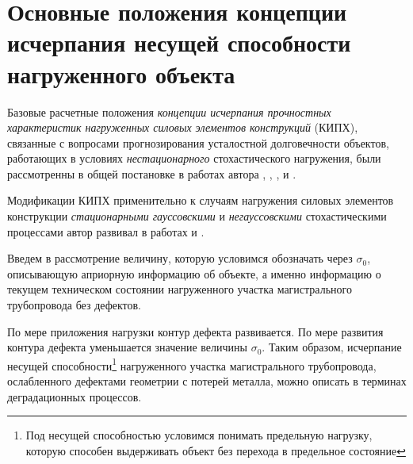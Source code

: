 \chapter{Основные положения концепции исчерпания несущей способности нагруженного объекта}\label{ch:ch1}

Базовые расчетные положения \emph{концепции исчерпания прочностных характеристик нагруженных силовых элементов конструкций} (КИПХ), связанные с вопросами прогнозирования усталостной долговечности объектов, работающих в условиях \emph{нестационарного} стохастического нагружения, были рассмотренны в общей постановке в работах автора \cite{podvoyskiy-ipmash:2009}, \cite{podvoyskiy-fund-prob:2010}, \cite{podvoyskiy-mami:2010}, \cite{podvoyskiy-sstu:2010} и \cite{podvoyskiy-sstu:2011}.

Модификации КИПХ применительно к случаям нагружения силовых элементов конструкции \emph{стационарными гауссовскими} и \emph{негауссовскими} стохастическими процессами автор развивал в работах \cite{podvoyskiy-vestnik:2013} и \cite{podvoyskiy-mami:2012}.

Введем в рассмотрение величину, которую условимся обозначать через $ \sigma_0 $, описывающую априорную информацию об объекте, а именно информацию о текущем техническом состоянии нагруженного участка магистрального трубопровода без дефектов.

По мере приложения нагрузки контур дефекта развивается. По мере развития контура дефекта уменьшается значение величины $ \sigma_0 $. Таким образом, исчерпание несущей способности\footnote{Под несущей способностью условимся понимать предельную нагрузку, которую способен выдерживать объект без перехода в предельное состояние} нагруженного участка магистрального трубопровода, ослабленного дефектами геометрии с потерей металла, можно описать в терминах деградационных процессов.
